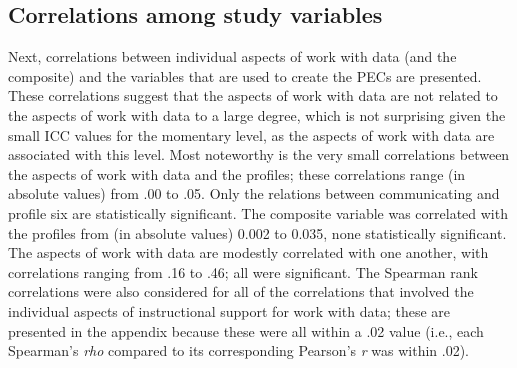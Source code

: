 \documentclass[]{book}
\theoremstyle{definition}
\theoremstyle{definition}
\theoremstyle{definition}
\theoremstyle{remark}
\begin{document}
\subsection{Correlations among study
variables}\label{correlations-among-study-variables}

Next, correlations between individual aspects of work with data (and the
composite) and the variables that are used to create the PECs are
presented. These correlations suggest that the aspects of work with data
are not related to the aspects of work with data to a large degree,
which is not surprising given the small ICC values for the momentary
level, as the aspects of work with data are associated with this level.
Most noteworthy is the very small correlations between the aspects of
work with data and the profiles; these correlations range (in absolute
values) from .00 to .05. Only the relations between communicating and
profile six are statistically significant. The composite variable was
correlated with the profiles from (in absolute values) 0.002 to 0.035,
none statistically significant. The aspects of work with data are
modestly correlated with one another, with correlations ranging from .16
to .46; all were significant. The Spearman rank correlations were also
considered for all of the correlations that involved the individual
aspects of instructional support for work with data; these are presented
in the appendix because these were all within a .02 value (i.e., each
Spearman's \emph{rho} compared to its corresponding Pearson's \emph{r}
was within .02).

\begin{landscape}\begin{table}

\caption{\label{tab:rq2-1-corr-components}Correlations among study variables}
\centering
{}
\end{table}
\end{landscape}
\end{document}
